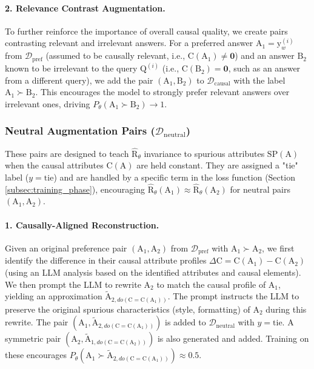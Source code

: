 \paragraph{2. Relevance Contrast Augmentation.}
To further reinforce the importance of overall causal quality, we create pairs contrasting relevant and irrelevant answers. For a preferred answer $\mathrm{A}_1 = \mathrm{y}_w^{(i)}$ from $\mathcal{D}_{\mathrm{pref}}$ (assumed to be causally relevant, i.e., $\mathrm{C}(\mathrm{A}_1) \neq \mathbf{0}$) and an answer $\mathrm{B}_2$ known to be irrelevant to the query $\mathrm{Q}^{(i)}$ (i.e., $\mathrm{C}(\mathrm{B}_2) = \mathbf{0}$, such as an answer from a different query), we add the pair $(\mathrm{A}_1, \mathrm{B}_2)$ to $\mathcal{D}_{\mathrm{causal}}$ with the label $\mathrm{A}_1 \succ \mathrm{B}_2$. This encourages the model to strongly prefer relevant answers over irrelevant ones, driving $P_\theta(\mathrm{A}_1 \succ \mathrm{B}_2) \to 1$.

\subsubsection{Neutral Augmentation Pairs (\texorpdfstring{$\mathcal{D}_{\mathrm{neutral}}$}{D-neutral})}
These pairs are designed to teach $\hat{\mathrm{R}}_\theta$ invariance to spurious attributes $\mathrm{SP}(\mathrm{A})$ when the causal attributes $\mathrm{C}(\mathrm{A})$ are held constant. They are assigned a "tie" label ($y=\text{tie}$) and are handled by a specific term in the loss function (Section \ref{subsec:training_phase}), encouraging $\hat{\mathrm{R}}_\theta(\mathrm{A}_1) \approx \hat{\mathrm{R}}_\theta(\mathrm{A}_2)$ for neutral pairs $(\mathrm{A}_1, \mathrm{A}_2)$.

\paragraph{1. Causally-Aligned Reconstruction.}
Given an original preference pair $(\mathrm{A}_1, \mathrm{A}_2)$ from $\mathcal{D}_{\mathrm{pref}}$ with $\mathrm{A}_1 \succ \mathrm{A}_2$, we first identify the difference in their causal attribute profiles $\Delta \mathrm{C} = \mathrm{C}(\mathrm{A}_1) - \mathrm{C}(\mathrm{A}_2)$ (using an LLM analysis based on the identified attributes and causal elements). We then prompt the LLM to rewrite $\mathrm{A}_2$ to match the causal profile of $\mathrm{A}_1$, yielding an approximation $\tilde{\mathrm{A}}_{2, do(\mathrm{C} = \mathrm{C}(\mathrm{A}_1))}$. The prompt instructs the LLM to preserve the original spurious characteristics (style, formatting) of $\mathrm{A}_2$ during this rewrite. The pair $(\mathrm{A}_1, \tilde{\mathrm{A}}_{2, do(\mathrm{C} = \mathrm{C}(\mathrm{A}_1))})$ is added to $\mathcal{D}_{\mathrm{neutral}}$ with $y=\text{tie}$. A symmetric pair $(\mathrm{A}_2, \tilde{\mathrm{A}}_{1, do(\mathrm{C} = \mathrm{C}(\mathrm{A}_2))})$ is also generated and added. Training on these encourages $P_\theta(\mathrm{A}_1 \succ \tilde{\mathrm{A}}_{2, do(\mathrm{C}=\mathrm{C}(\mathrm{A}_1))}) \approx 0.5$.

